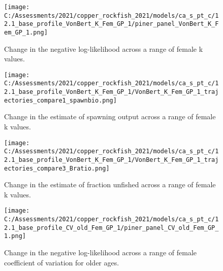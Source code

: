 \documentclass[11pt,
  english,
  a4paper,
]{article}
\begin{document}
\tagmcend\tagstructend


\begin{figure}
\centering
\texttt{[image: C:/Assessments/2021/copper\_rockfish\_2021/models/ca\_s\_pt\_c/12.1\_base\_profile\_VonBert\_K\_Fem\_GP\_1/piner\_panel\_VonBert\_K\_Fem\_GP\_1.png]}
\caption{Change in the negative log-likelihood across a range of female k values.\label{fig:k-profile}}
\end{figure}

\tagmcend\tagstructend


\begin{figure}
\centering
\texttt{[image: C:/Assessments/2021/copper\_rockfish\_2021/models/ca\_s\_pt\_c/12.1\_base\_profile\_VonBert\_K\_Fem\_GP\_1/VonBert\_K\_Fem\_GP\_1\_trajectories\_compare1\_spawnbio.png]}
\caption{Change in the estimate of spawning output across a range of female k values.\label{fig:k-ssb}}
\end{figure}

\tagmcend\tagstructend


\begin{figure}
\centering
\texttt{[image: C:/Assessments/2021/copper\_rockfish\_2021/models/ca\_s\_pt\_c/12.1\_base\_profile\_VonBert\_K\_Fem\_GP\_1/VonBert\_K\_Fem\_GP\_1\_trajectories\_compare3\_Bratio.png]}
\caption{Change in the estimate of fraction unfished across a range of female k values.\label{fig:k-depl}}
\end{figure}

\tagmcend\tagstructend


\begin{figure}
\centering
\texttt{[image: C:/Assessments/2021/copper\_rockfish\_2021/models/ca\_s\_pt\_c/12.1\_base\_profile\_CV\_old\_Fem\_GP\_1/piner\_panel\_CV\_old\_Fem\_GP\_1.png]}
\caption{Change in the negative log-likelihood across a range of female coefficient of variation for older ages.\label{fig:cv-profile}}
\end{figure}

\tagmcend\tagstructend
\end{document}
